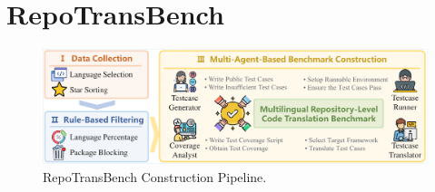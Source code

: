 

\section{RepoTransBench}

\begin{figure}
    \centering
    \includegraphics[width=0.95\linewidth]{figures/BenchmarkConstruction.pdf}
    \caption{RepoTransBench Construction Pipeline.}
    \label{fig:BenchmarkConstruction}
\end{figure}


